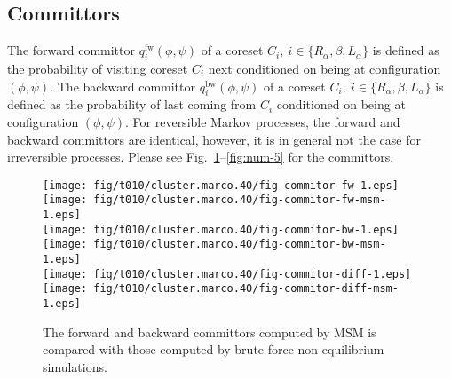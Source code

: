 \documentclass[aps, pre, preprint,unsortedaddress,a4paper,onecolumn]{revtex4}
\newcommand{\fwd}[0]{\textrm{fw}}
\newcommand{\bwd}[0]{\textrm{bw}}
\begin{document}

\subsection{Committors}

The forward committor $q^\fwd_i(\phi,\psi)$ of a coreset $C_i,\ i\in\{R_\alpha, \beta, L_\alpha\}$ is defined as
the probability of visiting coreset $C_i$ next conditioned on being at configuration $(\phi,\psi)$.
The backward committor $q^\bwd_i(\phi,\psi)$ of a coreset $C_i,\ i\in\{R_\alpha, \beta, L_\alpha\}$ is defined as
the probability of last coming from $C_i$  conditioned on being at configuration $(\phi,\psi)$.
For  reversible Markov processes, the forward and backward committors are identical, however, it is in general not the case
for irreversible processes. Please see Fig.~\ref{fig:num-3}--\ref{fig:num-5} for the committors.

\begin{figure}
  \centering
  \texttt{[image: fig/t010/cluster.marco.40/fig-commitor-fw-1.eps]}
  \texttt{[image: fig/t010/cluster.marco.40/fig-commitor-fw-msm-1.eps]}\\
  \texttt{[image: fig/t010/cluster.marco.40/fig-commitor-bw-1.eps]}
  \texttt{[image: fig/t010/cluster.marco.40/fig-commitor-bw-msm-1.eps]}\\
  \texttt{[image: fig/t010/cluster.marco.40/fig-commitor-diff-1.eps]}
  \texttt{[image: fig/t010/cluster.marco.40/fig-commitor-diff-msm-1.eps]}
  \caption{The forward and backward committors computed by MSM is compared with those computed by brute force non-equilibrium simulations.}
  \label{fig:num-3}
\end{figure}
\end{document}
